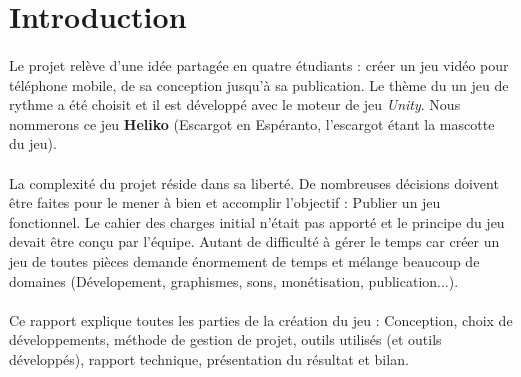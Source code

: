 \section{Introduction}

\paragraph{}
Le projet relève d'une idée partagée en quatre étudiants : créer un jeu vidéo pour téléphone mobile, de sa conception jusqu'à sa publication. Le thème du un jeu de rythme a été choisit et il est développé avec le moteur de jeu \textit{Unity}. Nous nommerons ce jeu \textbf{Heliko} (Escargot en Espéranto, l'escargot étant la mascotte du jeu).


\paragraph{}
La complexité du projet réside dans sa liberté. De nombreuses décisions doivent être faites pour le mener à bien et accomplir l'objectif : Publier un jeu fonctionnel. Le cahier des charges initial n'était pas apporté et le principe du jeu devait être conçu par l'équipe. Autant de difficulté à gérer le temps car créer un jeu de toutes pièces demande énormement de temps et mélange beaucoup de domaines (Dévelopement, graphismes, sons, monétisation, publication...).

\paragraph{}
Ce rapport explique toutes les parties de la création du jeu : Conception, choix de développements, méthode de gestion de projet, outils utilisés (et outils développés), rapport technique, présentation du résultat et bilan.

